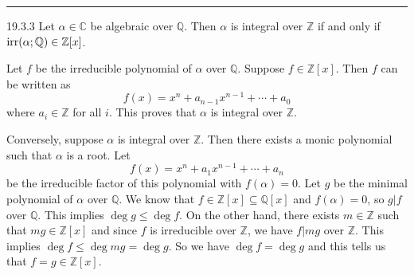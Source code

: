 \documentclass[letterpaper, 12pt]{article}
\begin{document}
\noindent\rule{7in}{2.8pt}
\begin{problem}{19.3.3}
Let \(\alpha \in \mathbb{C}\) be algebraic over \(\mathbb{Q}\). Then \(\alpha\) is integral over \(\mathbb{Z}\) if and only if \(\text{irr}(\alpha;\mathbb{Q})\in \mathbb{Z}[x]\).
\end{problem}
\begin{solution}
Let \(f\) be the irreducible polynomial of \(\alpha\) over \(\mathbb{Q}\). Suppose \(f\in \mathbb{Z}[x]\). Then \(f\) can be written as 
\[f(x)=x^n+a_{n-1}x^{n-1}+\cdots+a_0\]
where \(a_i\in \mathbb{Z}\) for all \(i\). This proves that \(\alpha\) is integral over \(\mathbb{Z}\). 

Conversely, suppose \(\alpha\) is integral over \(\mathbb{Z}\). Then there exists a monic polynomial 
such that \(\alpha\) is a root. Let 
\[f(x)=x^n+a_1x^{n-1}+\cdots+a_n\] 
be the irreducible factor of this polynomial with \(f(\alpha)=0\). Let \(g\) be the minimal polynomial of \(\alpha\) over \(\mathbb{Q}\). We know that \(f\in \mathbb{Z}[x]\subseteq \mathbb{Q}[x]\) and \(f(\alpha)=0\), so \(g|f\) over \(\mathbb{Q}\). This implies \(\deg g\leq \deg f\). On the other hand, there exists \(m\in \mathbb{Z}\) such that \(mg\in \mathbb{Z}[x]\) and since \(f\) is irreducible over \(\mathbb{Z}\), we have \(f|mg\) over \(\mathbb{Z}\). This implies \(\deg f\leq \deg mg=\deg g\). So we have \(\deg f=\deg g\) and this tells us that \(f=g\in \mathbb{Z}[x]\).
\end{solution}
\end{document}
